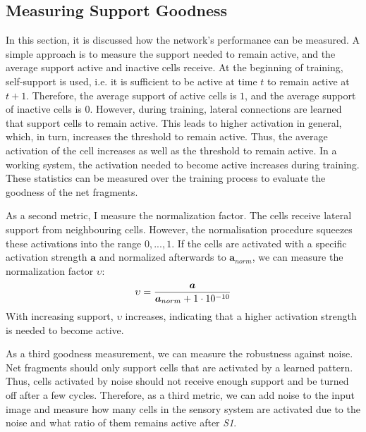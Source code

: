 \subsection{Measuring Support Goodness}
In this section, it is discussed how the network's performance can be measured.
A simple approach is to measure the support needed to remain active, and the average support active and inactive cells receive.
At the beginning of training, self-support is used, i.e. it is sufficient to be active at time $t$ to remain active at $t+1$.
Therefore, the average support of active cells is $1$, and the average support of inactive cells is $0$.
However, during training, lateral connections are learned that support cells to remain active.
This leads to higher activation in general, which, in turn, increases the threshold to remain active.
Thus, the average activation of the cell increases as well as the threshold to remain active.
In a working system, the activation needed to become active increases during training.
These statistics can be measured over the training process to evaluate the goodness of the net fragments.

As a second metric, I measure the normalization factor.
The cells receive lateral support from neighbouring cells.
However, the normalisation procedure squeezes these activations into the range $0, ..., 1$.
If the cells are activated with a specific activation strength $\boldsymbol{a}$ and normalized afterwards to $\boldsymbol{a}_{norm}$, we can measure the normalization factor 
$\upsilon$:
\begin{align}\eqlbl{goodness_lat}
	\upsilon = \frac{\boldsymbol{a}}{\boldsymbol{a}_{norm}+1\cdot10^{-10}}
\end{align}
With increasing support, $\upsilon$ increases, indicating that a higher activation strength is needed to become active.

As a third goodness measurement, we can measure the robustness against noise.
Net fragments should only support cells that are activated by a learned pattern. Thus, cells activated by noise should not receive enough support and be turned off after a few cycles.
Therefore, as a third metric, we can add noise to the input image and measure how many cells in the sensory system are activated due to the noise and what ratio of them remains active after \emph{S1}.































